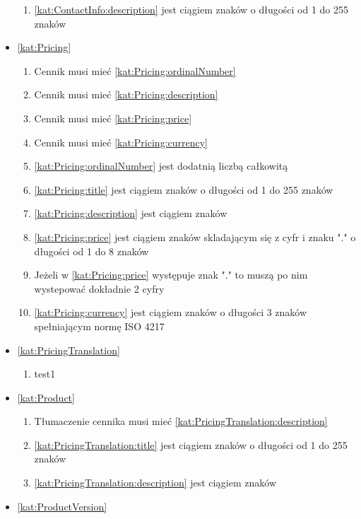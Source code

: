 \begin{itemize}[label={\textbf{Ograniczenia dla}}, wide, labelwidth=!, labelindent=0pt]
\begin{enumerate}[label={\textbf{OGR/\protect\threedigits{\arabic{enumi}}}}, wide, labelwidth=!, align=left, leftmargin=3cm, resume]
        \item \ref{kat:ContactInfo:description} jest ciągiem znaków o długości od 1 do 255 znaków
    \end{enumerate}
    \item\ref{kat:Pricing}
    \begin{enumerate}[label={\textbf{OGR/\protect\threedigits{\arabic{enumi}}}}, wide, labelwidth=!, align=left, leftmargin=3cm, resume]
        \item Cennik musi mieć \ref{kat:Pricing:ordinalNumber}
        \item Cennik musi mieć \ref{kat:Pricing:description}
        \item Cennik musi mieć \ref{kat:Pricing:price}
        \item Cennik musi mieć \ref{kat:Pricing:currency}
        \item \ref{kat:Pricing:ordinalNumber} jest dodatnią liczbą całkowitą
        \item \ref{kat:Pricing:title} jest ciągiem znaków o długości od 1 do 255 znaków
        \item \ref{kat:Pricing:description} jest ciągiem znaków
        \item \ref{kat:Pricing:price} jest ciągiem znaków skladającym się z cyfr i znaku "." o długości od 1 do 8 znaków
        \item Jeżeli w \ref{kat:Pricing:price} występuje znak "." to muszą po nim wystepować dokładnie 2 cyfry
        \item \ref{kat:Pricing:currency} jest ciągiem znaków o długości 3 znaków spełniającym normę ISO 4217
    \end{enumerate}
    \item\ref{kat:PricingTranslation}
    \begin{enumerate}[label={\textbf{OGR/\protect\threedigits{\arabic{enumi}}}}, wide, labelwidth=!, align=left, leftmargin=3cm, resume]
        \item test1
    \end{enumerate}
    \item\ref{kat:Product}
    \begin{enumerate}[label={\textbf{OGR/\protect\threedigits{\arabic{enumi}}}}, wide, labelwidth=!, align=left, leftmargin=3cm, resume]
        \item Tłumaczenie cennika musi mieć \ref{kat:PricingTranslation:description}
        \item \ref{kat:PricingTranslation:title} jest ciągiem znaków o długości od 1 do 255 znaków
        \item \ref{kat:PricingTranslation:description} jest ciągiem znaków
    \end{enumerate}
    \item\ref{kat:ProductVersion}
    \begin{enumerate}[label={\textbf{OGR/\protect\threedigits{\arabic{enumi}}}}, wide, labelwidth=!, align=left, leftmargin=3cm, resume]


\end{enumerate}
\end{itemize}
